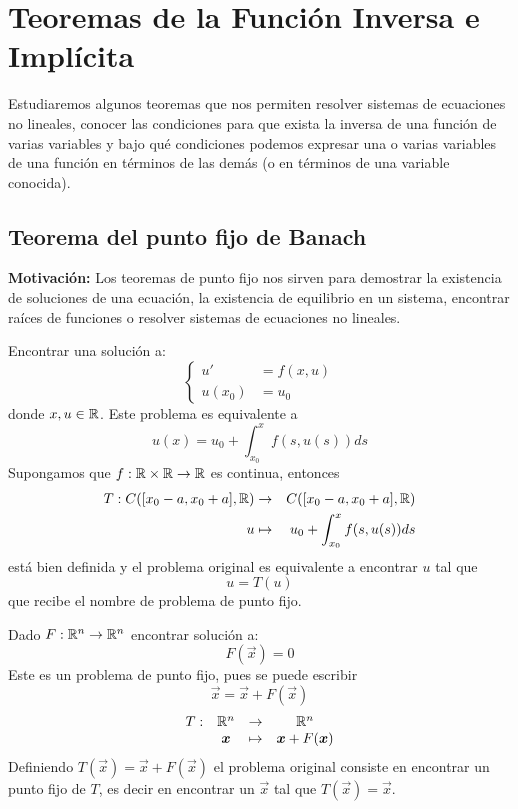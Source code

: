 \chapter{Teoremas de la Funci\'on Inversa e Impl\'icita}\label{cap5}

Estudiaremos algunos teoremas que nos permiten resolver sistemas de ecuaciones no lineales, conocer las condiciones para que exista la inversa de una funci\'on de varias variables y bajo qu\'e condiciones podemos expresar una o varias variables de una funci\'on en t\'erminos de las dem\'as (o en t\'erminos de una variable conocida).

\section{Teorema del punto fijo de Banach}

\textbf{Motivaci\'on:} Los teoremas de punto fijo nos sirven para demostrar la existencia de soluciones de una ecuaci\'on, la existencia de equilibrio en un sistema, encontrar ra\'ices de funciones o resolver sistemas de ecuaciones no lineales.

\begin{problema}\label{problema 3.1}
Encontrar una soluci\'on a: 
$$\begin{cases}u'&= f(x,u)\\ 
u(x_0) &= u_0
\end{cases}$$ 
donde $x,u\in \mathbb{R}$.
Este problema es equivalente a
$$u(x)=u_0+\int_{x_0}^x{f(s,u(s))ds}$$ 
Supongamos que
$f:{\mathbb{R}}\times{\mathbb{R}}\to \mathbb{R}$ es continua, entonces
\begin{eqnarray*}
T:C([x_0-a,x_0+a],\mathbb{R}) & \to & C([x_0-a,x_0+a],\mathbb{R}) \\ u & \mapsto
& u_0+\int_{x_0}^x{f(s,u(s))ds}
\end{eqnarray*} 
est\'a bien definida y el problema original es equivalente a encontrar $u$ tal que $$u=T(u)$$ que recibe el nombre de problema de punto fijo.
\end{problema}

\begin{problema}
Dado $F:{\mathbb{R}}^n\to {\mathbb{R}}^n$ encontrar soluci\'on a: 
$$F(\vec{x})=0$$ 
Este es un problema de punto fijo, pues se puede escribir 
$$\vec{x}=\vec{x}+F(\vec{x})$$ 
$$
\begin{matrix}
T:&{\mathbb{R}}^n&\to&{\mathbb{R}}^n\cr 
&\boldsymbol{x}&\mapsto& \boldsymbol{x}+F(\boldsymbol{x})
\end{matrix}$$
Definiendo $T(\vec{x})=\vec{x}+F(\vec{x})$ el problema original consiste en encontrar un punto fijo de $T$, es decir en encontrar un $\vec{x}$ tal que $T(\vec{x})=\vec{x}$.
\end{problema}

